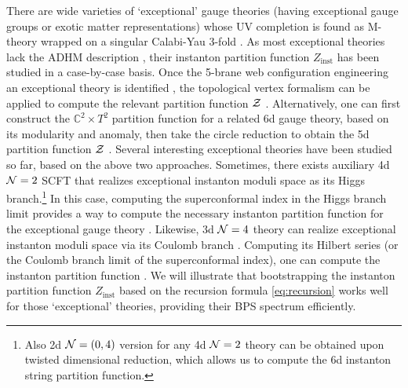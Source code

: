 \documentclass[letterpaper, 11pt]{article}
\def\IC{\mathbb{C}}
\def\CN{{\cal N}}
\def\CZ{{\cal Z}}
\begin{document}
{There are wide varieties of `exceptional' gauge theories (having exceptional gauge groups or exotic matter representations) whose UV completion is found as M-theory wrapped on a singular Calabi-Yau 3-fold \cite{Diaconescu:1998cn, Jefferson:2018irk, Bhardwaj:2018yhy, Apruzzi:2019opn}. 
As most exceptional theories lack the ADHM description \cite{Kim:2018gjo}, their instanton partition function $Z_\text{inst}$ has been studied in a case-by-case basis. Once the 5-brane web configuration engineering an exceptional theory is identified \cite{Zafrir:2015ftn, Hayashi:2018bkd, Hayashi:2019yxj}, the topological vertex formalism can be applied to compute the relevant partition function $\CZ$ \cite{Hollowood:2003cv, Iqbal:2007ii}. 
Alternatively, one can first construct the $\IC^2 \times T^2$ partition function for a related 6d gauge theory, based on its modularity and anomaly, then take the circle reduction to obtain the 5d partition function $\CZ$ \cite{DelZotto:2016pvm, DelZotto:2018tcj}. Several interesting exceptional theories have been studied so far, based on the above two approaches.
Sometimes, there exists auxiliary 4d $\CN=2$ SCFT \cite{Benini:2009gi} that realizes exceptional instanton moduli space as its Higgs branch.\footnote{Also 2d $\CN=(0, 4)$ version \cite{Putrov:2015jpa} for any 4d $\CN=2$ theory can be obtained upon twisted dimensional reduction, which allows us to compute the 6d instanton string partition function.} In this case, computing the superconformal index in the Higgs branch limit provides a way to compute the necessary instanton partition function for the exceptional gauge theory \cite{Gadde:2010te, Gadde:2011uv, Gaiotto:2012uq, Gadde:2015xta, Agarwal:2018ejn}. 
Likewise, 3d $\CN=4$ theory can realize exceptional instanton moduli space via its Coulomb branch \cite{Intriligator:1996ex}. Computing its Hilbert series (or the Coulomb branch limit of the superconformal index), one can compute the instanton partition function \cite{Cremonesi:2013lqa, Cremonesi:2014xha}. 
We will illustrate that bootstrapping the instanton partition function $Z_{\text{inst}}$ based on the recursion formula \eqref{eq:recursion} works well for those `exceptional' theories, providing their BPS spectrum efficiently.



}
\end{document}
